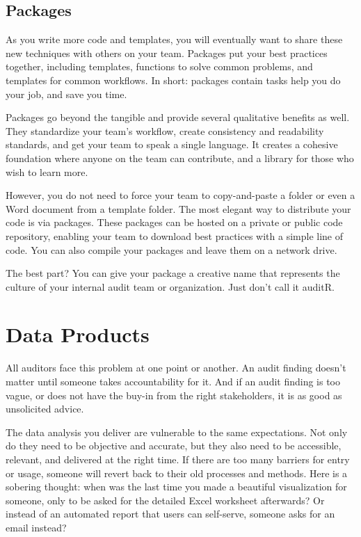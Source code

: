 \documentclass[
]{book}
\begin{document}
\hypertarget{packages}{%
\subsection{Packages}\label{packages}}

As you write more code and templates, you will eventually want to share these new techniques with others on your team. Packages put your best practices together, including templates, functions to solve common problems, and templates for common workflows. In short: packages contain tasks help you do your job, and save you time.

Packages go beyond the tangible and provide several qualitative benefits as well. They standardize your team's workflow, create consistency and readability standards, and get your team to speak a single language. It creates a cohesive foundation where anyone on the team can contribute, and a library for those who wish to learn more.

However, you do not need to force your team to copy-and-paste a folder or even a Word document from a template folder. The most elegant way to distribute your code is via packages. These packages can be hosted on a private or public code repository, enabling your team to download best practices with a simple line of code. You can also compile your packages and leave them on a network drive.

The best part? You can give your package a creative name that represents the culture of your internal audit team or organization. Just don't call it auditR.

\hypertarget{data-products}{%
\section{Data Products}\label{data-products}}

All auditors face this problem at one point or another. An audit finding doesn't matter until someone takes accountability for it. And if an audit finding is too vague, or does not have the buy-in from the right stakeholders, it is as good as unsolicited advice.

The data analysis you deliver are vulnerable to the same expectations. Not only do they need to be objective and accurate, but they also need to be accessible, relevant, and delivered at the right time. If there are too many barriers for entry or usage, someone will revert back to their old processes and methods. Here is a sobering thought: when was the last time you made a beautiful visualization for someone, only to be asked for the detailed Excel worksheet afterwards? Or instead of an automated report that users can self-serve, someone asks for an email instead?
\end{document}

